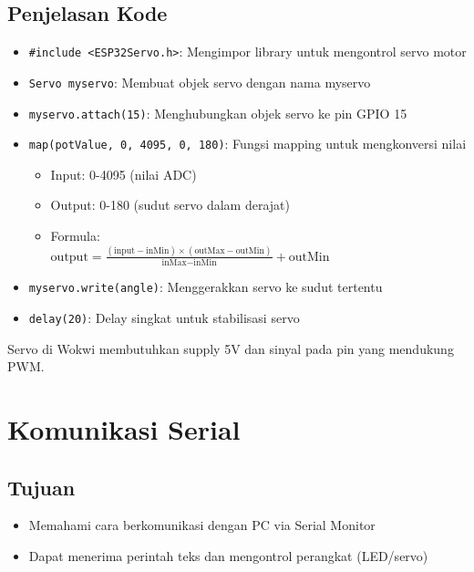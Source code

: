 \documentclass[12pt,a4paper]{article}
\begin{document}
\subsection{Penjelasan Kode}
\begin{itemize}
    \item \texttt{\#include <ESP32Servo.h>}: Mengimpor library untuk mengontrol servo motor
    \item \texttt{Servo myservo}: Membuat objek servo dengan nama myservo
    \item \texttt{myservo.attach(15)}: Menghubungkan objek servo ke pin GPIO 15
    \item \texttt{map(potValue, 0, 4095, 0, 180)}: Fungsi mapping untuk mengkonversi nilai
    \begin{itemize}
        \item Input: 0-4095 (nilai ADC)
        \item Output: 0-180 (sudut servo dalam derajat)
        \item Formula: \\
        $\text{output} = \frac{(\text{input} - \text{inMin}) \times (\text{outMax} - \text{outMin})}{\text{inMax} - \text{inMin}} + \text{outMin}$
    \end{itemize}
    \item \texttt{myservo.write(angle)}: Menggerakkan servo ke sudut tertentu
    \item \texttt{delay(20)}: Delay singkat untuk stabilisasi servo
\end{itemize}

\begin{tcolorbox}[colback=yellow!5!white,colframe=yellow!75!black,title=Catatan]
Servo di Wokwi membutuhkan supply 5V dan sinyal pada pin yang mendukung PWM.
\end{tcolorbox}

\newpage
\section{Komunikasi Serial}

\subsection{Tujuan}
\begin{itemize}
    \item Memahami cara berkomunikasi dengan PC via Serial Monitor
    \item Dapat menerima perintah teks dan mengontrol perangkat (LED/servo)
\end{itemize}
\end{document}
